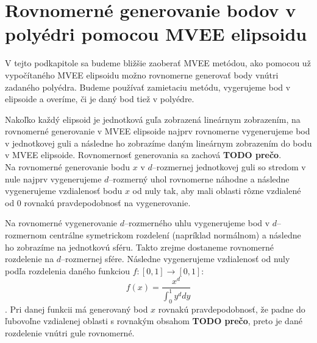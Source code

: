 \section {Rovnomerné generovanie bodov v polyédri pomocou MVEE elipsoidu}

V tejto podkapitole sa budeme bližšie zaoberať MVEE metódou, ako pomocou už vypočítaného MVEE elipsoidu možno rovnomerne generovať body vnútri zadaného polyédra. Budeme používať zamietaciu metódu, vygerujeme bod v elipsoide a overíme, či je daný bod tiež v polyédre.

Nakoľko každý elipsoid je jednotková guľa zobrazená lineárnym zobrazením, na rovnomerné generovanie v MVEE elipsoide najprv rovnomerne vygenerujeme bod v jednotkovej guli a následne ho zobrazíme daným lineárnym zobrazením do bodu v MVEE elipsoide. Rovnomernosť generovania sa zachová \textbf{TODO prečo}.\\

Na rovnomerné generovanie bodu $x$ v $d$--rozmernej jednotkovej guli so stredom v nule najprv vygenerujeme $d$--rozmerný uhol rovnomerne náhodne a následne vygenerujeme vzdialenosť bodu $x$ od nuly tak, aby mali oblasti rôzne vzdialené od $0$ rovnakú pravdepodobnosť na vygenerovanie.

Na rovnomerné vygenerovanie $d$--rozmerného uhlu vygenerujeme bod v $d$--rozmernom centrálne symetrickom rozdelení (napríklad normálnom) a následne ho zobrazíme na jednotkovú sféru. Takto zrejme dostaneme rovnomerné rozdelenie na $d$--rozmernej sfére. Následne vygenerujeme vzdialenosť od nuly podľa rozdelenia daného funkciou $f:[0,1] \rightarrow [0,1]$: $$f(x)=\frac{x^d}{\int_0^1 y^d dy}$$.
Pri danej funkcii má generovaný bod $x$ rovnakú pravdepodobnosť, že padne do ľubovoľne vzdialenej oblasti s rovnakým obsahom \textbf{TODO prečo}, preto je dané rozdelenie vnútri gule rovnomerné.